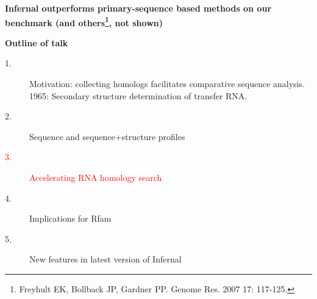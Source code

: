 \documentclass[landscape]{slides}
\begin{document}
\begin{slide}
\begin{center}

\textbf{Infernal outperforms primary-sequence based methods on our
  benchmark (and others\footnote{Freyhult EK, Bollback JP, Gardner
    PP. Genome Res. 2007 17: 117-125.}, not shown)}

\end{center}
\medskip


\vfill 
\end{slide}
\begin{slide}
\begin{center}
\textbf{Outline of talk}

\begin{description}
\item[1.] Motivation: collecting homologs facilitates comparative
  sequence analysis.\\ 1965: Secondary structure determination of
  transfer RNA.
\item[2.] Sequence and sequence+structure profiles
\item[\textcolor{red}{3.}] \textcolor{red}{Accelerating RNA homology search}
\item[4.] Implications for Rfam
\item[5.] New features in latest version of Infernal
\end{description}

\end{center}
\vfill
\end{slide}
\end{document}
